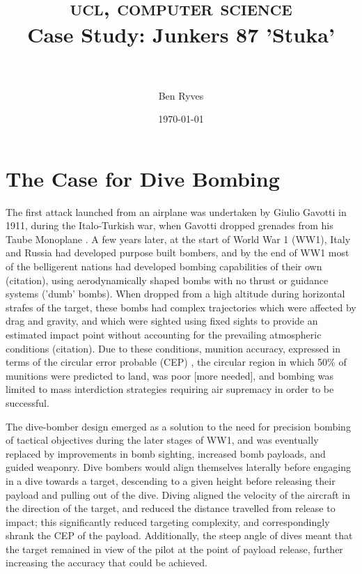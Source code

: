 \documentclass[a4paper, fontsize=11pt]{scrartcl} %
\title{
        \normalfont \normalsize
        \textsc{ucl, computer science}
        \horrule{0.5pt} \\[0.4cm]
        \huge{Case Study: Junkers 87 'Stuka'}\\
        \horrule{0.5pt} \\[0.5cm]
}
\author{Ben Ryves}
\date{\normalsize\today}
\begin{document}
\maketitle




\section{The Case for Dive Bombing}

The first attack launched from an airplane was undertaken by Giulio
Gavotti in 1911, during the Italo-Turkish war, when Gavotti dropped
grenades from his Taube Monoplane \autocite{bbc11}. A few years later,
at the start of World War 1 (WW1), Italy and Russia had developed purpose
built bombers, and by the end of WW1 most of the belligerent nations
had developed bombing capabilities of their own (citation), using
aerodynamically shaped bombs with no thrust or guidance systems ('dumb'
bombs). When dropped from a
high altitude during horizontal strafes of the target, these bombs had
complex trajectories which were affected by drag and gravity, and
which were sighted using fixed sights to provide an estimated impact point
without accounting for the prevailing atmospheric conditions
(citation). Due to these conditions, munition accuracy, expressed in
terms of the  circular error probable (CEP) \autocite{cep88}, the
circular region in which 50\% of munitions were predicted to land, was
poor [more needed], and bombing was limited to mass interdiction strategies
requiring air supremacy in order to be successful.

The dive-bomber design emerged as a solution to the need for precision
bombing of tactical objectives during the later stages of
WW1, and was eventually replaced by improvements in bomb sighting,
increased bomb payloads, and guided weaponry. Dive bombers would align themselves
laterally before engaging in a dive towards a target,
descending to a given height before releasing their payload and pulling
out of the dive. Diving aligned the velocity of the aircraft in the
direction of the target, and reduced the distance travelled from release
to impact; this significantly reduced targeting complexity, and
correspondingly shrank the CEP of the payload. Additionally, the steep angle of dives
meant that the target remained in view of the pilot at the
point of payload release, further increasing the accuracy that could be
achieved.
\end{document}
